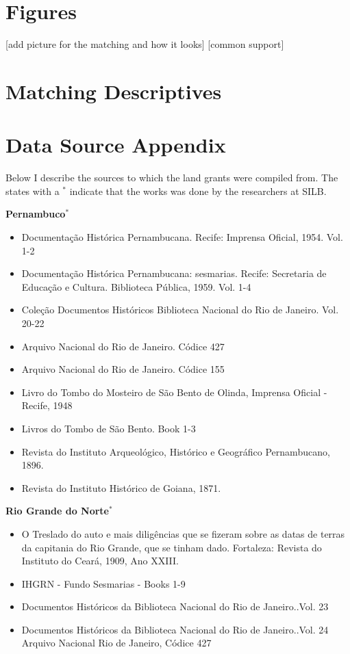 \documentclass{article}
\begin{document}
\section{Figures}

[add picture for the matching and how it looks]
[common support]

\clearpage

\section{Matching Descriptives}
\label{app:matching_checks}

\clearpage


\section{Data Source Appendix}
\label{app:data_source_appendix}

Below I describe the sources to which the land grants were compiled from. The states with a $^*$ indicate that the works was done by the researchers at SILB.

\textbf{Pernambuco$^*$}
\begin{itemize}
\item Documentação Histórica Pernambucana. Recife: Imprensa Oficial, 1954. Vol. 1-2
\item Documentação Histórica Pernambucana: sesmarias. Recife: Secretaria de Educação e Cultura. Biblioteca Pública, 1959. Vol. 1-4
\item Coleção Documentos Históricos Biblioteca Nacional do Rio de Janeiro. Vol. 20-22
\item Arquivo Nacional do Rio de Janeiro. Códice 427
\item Arquivo Nacional do Rio de Janeiro. Códice 155
\item Livro do Tombo do Mosteiro de São Bento de Olinda, Imprensa Oficial - Recife, 1948
\item Livros do Tombo de São Bento. Book 1-3
\item Revista do Instituto Arqueológico, Histórico e Geográfico Pernambucano, 1896.
\item Revista do Instituto Histórico de Goiana, 1871.
\end{itemize}

\textbf{Rio Grande do Norte$^*$}
\begin{itemize}
  \item O Treslado do auto e mais diligências que se fizeram sobre as datas de terras da capitania do Rio Grande, que se tinham dado. Fortaleza: Revista do Instituto do Ceará, 1909, Ano XXIII.
  \item IHGRN - Fundo Sesmarias - Books 1-9
  \item Documentos Históricos da Biblioteca Nacional do Rio de Janeiro..Vol. 23
  \item Documentos Históricos da Biblioteca Nacional do Rio de Janeiro..Vol. 24 Arquivo Nacional Rio de Janeiro, Códice 427
\end{itemize}
\end{document}
